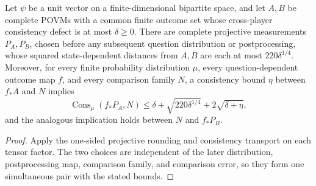 \begin{theorem}
\label{thm:qld-simultaneous-postprocessed-rounding}
\leanok
{}
Let $\psi$ be a unit vector on a finite-dimensional bipartite space, and let
$A,B$ be complete POVMs with a common finite outcome set whose cross-player
consistency defect is at most $\delta\geq0$. There are complete projective
measurements $P_A,P_B$, chosen before any subsequent question distribution or
postprocessing, whose squared state-dependent distances from $A,B$ are each at
most $220\delta^{1/4}$. Moreover, for every finite probability distribution
$\mu$, every question-dependent outcome map $f$, and every comparison family
$N$, a consistency bound $\eta$ between $f_*A$ and $N$ implies
\[
 \operatorname{Cons}_\mu(f_*P_A,N)
 \leq\delta+\sqrt{220\delta^{1/4}}+2\sqrt{\delta+\eta},
\]
and the analogous implication holds between $N$ and $f_*P_B$.
\end{theorem}
\begin{proof}
\leanok
{}
Apply the one-sided projective rounding and consistency transport on each
tensor factor. The two choices are independent of the later distribution,
postprocessing map, comparison family, and comparison error, so they form one
simultaneous pair with the stated bounds.
\end{proof}

